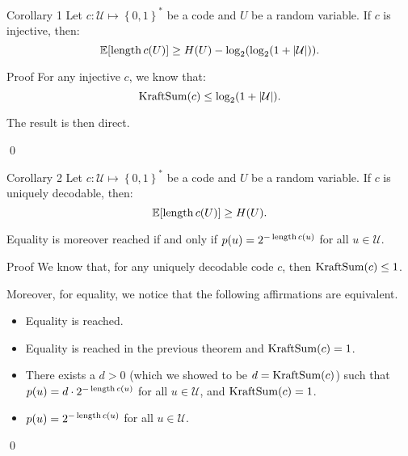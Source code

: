 \documentclass[a4paper]{article}
\begin{document}
\begin{parag}{Corollary 1}
    Let $c: \mathcal{U} \mapsto \left\{0, 1\right\}^*$ be a code and $U$ be a random variable. If $c$ is injective, then: 
    \[\exval\left[\length c\left(U\right)\right] \geq H\left(U\right) - \log_2\left(\log_2\left(1 + \left|\mathcal{U}\right|\right)\right).\]
    
    \begin{subparag}{Proof}
        For any injective $c$, we know that: 
        \[\KraftSum\left(c\right) \leq \log_2\left(1 + \left|\mathcal{U}\right|\right).\]

        The result is then direct.

        \qed
    \end{subparag}
\end{parag}

\begin{parag}{Corollary 2}
    Let $c: \mathcal{U} \mapsto \left\{0, 1\right\}^*$ be a code and $U$ be a random variable. If $c$ is uniquely decodable, then:
    \[\exval\left[\length c\left(U\right)\right] \geq H\left(U\right).\]

    Equality is moreover reached if and only if $p\left(u\right) = 2^{-\length c\left(u\right)}$ for all $u \in \mathcal{U}$.

    \begin{subparag}{Proof}
        We know that, for any uniquely decodable code $c$, then $\KraftSum\left(c\right) \leq 1$. 

        Moreover, for equality, we notice that the following affirmations are equivalent.
        \begin{itemize}
            \item Equality is reached.
            \item Equality is reached in the previous theorem and $\KraftSum\left(c\right) = 1$.
            \item There exists a $d > 0$ (which we showed to be $d = \KraftSum\left(c\right)$) such that $p\left(u\right) = d\cdot  2^{- \length c\left(u\right)}$ for all $u \in \mathcal{U}$, and $\KraftSum\left(c\right) = 1$.
            \item $p\left(u\right) = 2^{-\length c\left(u\right)}$ for all $u \in \mathcal{U}$.
        \end{itemize}
        
        \qed
    \end{subparag}
\end{parag}
\end{document}
